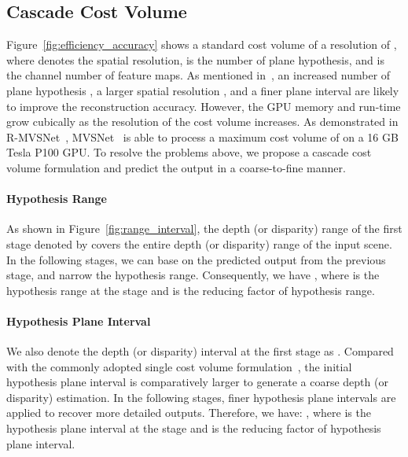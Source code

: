 \documentclass[10pt,twocolumn,letterpaper]{article}
\begin{document}
\subsection{Cascade Cost Volume}
Figure~\ref{fig:efficiency_accuracy} shows a standard cost volume of a resolution of , where  denotes the spatial resolution,  is the number of plane hypothesis, and  is the channel number of feature maps.
As mentioned in~\cite{yao2018mvsnet, yao2019recurrent, chen2019point}, 
an increased number of plane hypothesis , a larger spatial resolution , and a finer plane interval are likely to improve the reconstruction accuracy.
However, the GPU memory and run-time grow cubically as the resolution of the cost volume increases. 
As demonstrated in R-MVSNet~\cite{yao2019recurrent}, MVSNet~\cite{yao2018mvsnet} is able to process a maximum cost volume of  on a 16 GB Tesla P100 GPU.
To resolve the problems above, we propose a cascade cost volume formulation and predict the output in a coarse-to-fine manner.






\paragraph{Hypothesis Range}\vspace{-3mm}
As shown in Figure~\ref{fig:range_interval}, 
the depth (or disparity) range of the first stage denoted by  covers the entire depth (or disparity) range of the input scene.
In the following stages, we can base on the predicted output from the previous stage, and narrow the hypothesis range.
Consequently, we have , where  is the hypothesis range at the  stage and  is the reducing factor of hypothesis range.  

\paragraph{Hypothesis Plane Interval}\vspace{-3mm}
We also denote the depth (or disparity) interval at the first stage as .
Compared with the commonly adopted single cost volume formulation~\cite{chang2018pyramid, yao2018mvsnet}, the initial hypothesis plane interval is comparatively larger to generate a coarse depth (or disparity) estimation. 
In the following stages, finer hypothesis plane intervals are applied to recover more detailed outputs.
Therefore, we have: , where  is the hypothesis plane interval at the  stage and  is the reducing factor of hypothesis plane interval. 
\end{document}
